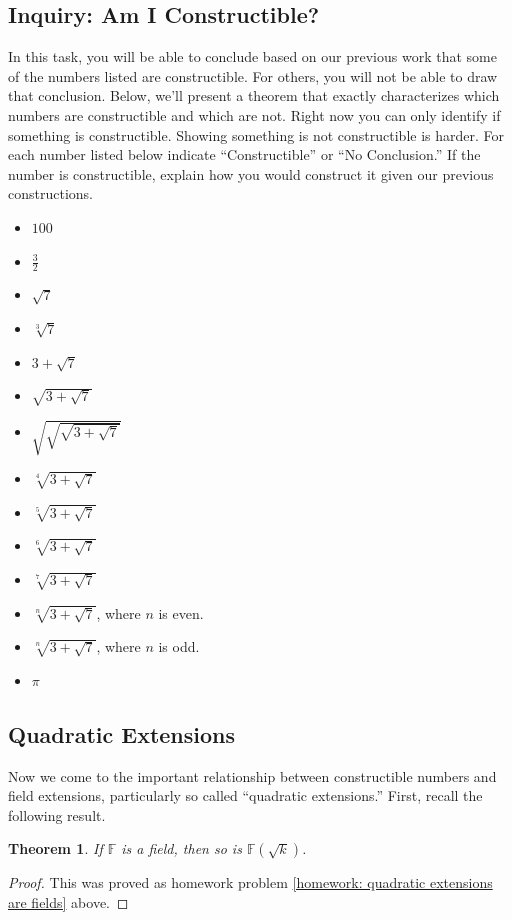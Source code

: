 \documentclass[11pt]{article}
\newenvironment{task}
	{\begin{mdframed}[linecolor=lightgray, linewidth=3pt]\raggedright}
	{\end{mdframed}}
\newtheorem{theorem}{Theorem}[section]
\theoremstyle{definition}
\begin{document}
\subsection{Inquiry: Am I Constructible?}
\begin{task}
  In this task, you will be able to conclude based on our previous work that some of the numbers listed are constructible. For others, you will not 
  be able to draw that conclusion. Below, we'll present a theorem that exactly characterizes which numbers are constructible and which are not. Right now
  you can only identify if something is constructible. Showing something is not constructible is harder. For each number listed below indicate ``Constructible''
  or ``No Conclusion.'' If the number is constructible, explain how you would construct it given our previous constructions.
  \begin{itemize}
    \item $100$
    \item $\frac{3}{2}$
    \item $\sqrt{7}$
    \item $\sqrt[3]{7}$
    \item $3 + \sqrt{7}$
    \item $\sqrt{3 + \sqrt{7}}$
    \item $\sqrt{\sqrt{\sqrt{3+\sqrt{7}}}}$
    \item $\sqrt[4]{3 + \sqrt{7}}$
    \item $\sqrt[5]{3 + \sqrt{7}}$
    \item $\sqrt[6]{3 + \sqrt{7}}$
    \item $\sqrt[7]{3 + \sqrt{7}}$
    \item $\sqrt[n]{3 + \sqrt{7}}$, where $n$ is even.
    \item $\sqrt[n]{3 + \sqrt{7}}$, where $n$ is odd.
    \item $\pi$
  \end{itemize}
\end{task}

\subsection{Quadratic Extensions}

Now we come to the important relationship between constructible numbers and field extensions, particularly so called ``quadratic extensions.'' First, recall
the following result.

\begin{theorem}
  If $\mathbb{F}$ is a field, then so is $\mathbb{F}(\sqrt{k})$.
  \label{theorem: quadratic extensions of fields are fields}
\end{theorem}
\begin{proof}
  This was proved as homework problem \ref{homework: quadratic extensions are fields} above.
\end{proof}
\end{document}
